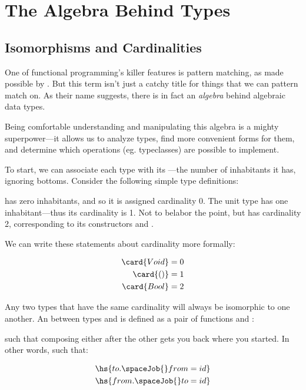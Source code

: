 \documentclass[book.tex]{subfiles}
\begin{document}
\chapter{The Algebra Behind Types}

\section{Isomorphisms and Cardinalities}

One of functional programming's killer features is pattern matching, as made
possible by . But this term
isn't just a catchy title for things that we can pattern match on. As their name
suggests, there is in fact an \emph{algebra} behind algebraic data types.

Being comfortable understanding and manipulating this algebra is a mighty
superpower---it allows us to analyze types, find more convenient forms for them,
and determine which operations (eg. typeclasses) are possible to implement.

To start, we can associate each type with its ---the number of
inhabitants it has, ignoring bottoms. Consider the following simple type
definitions:


 has zero inhabitants, and so it is assigned cardinality 0. The unit
type \ty{()} has one inhabitant---thus its cardinality is 1. Not to belabor
the point, but  has cardinality 2, corresponding to its constructors
 and .

We can write these statements about cardinality more formally:

$$
\begin{align*}
  \card{Void} &= 0 \\
  \card{()} &= 1 \\
  \card{Bool} &= 2 \\
\end{align*}
$$

Any two types that have the same cardinality will always be isomorphic to one
another. An  between types  and  is defined as a
pair of functions  and :


such that composing either after the other gets you back where you started. In
other words, such that:

$$
\begin{align*}
  \hs{to .\spaceJob{}from = id} \\
  \hs{from .\spaceJob{}to = id} \\
\end{align*}
$$
\end{document}
